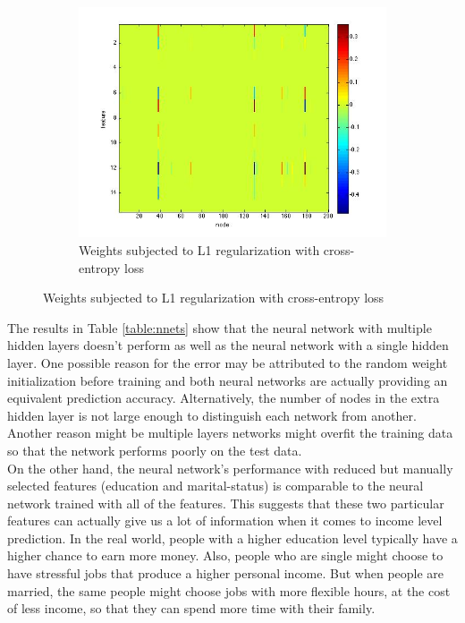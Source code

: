 \documentclass[conference]{IEEEtran}
\begin{document}
\begin{figure}
\begin{subfigure}{\linewidth}
\includegraphics[scale=0.4]{L1CE.jpg}
\caption{Weights subjected to L1 regularization with cross-entropy loss}\label{fig:L1CE}
\end{subfigure}%
\end{figure}
The results in Table \ref{table:nnets} show that the neural network with multiple hidden layers doesn't perform as well as the neural network with a single hidden layer. One possible reason for the error may be attributed to the random weight initialization before training and both neural networks are actually providing an equivalent prediction accuracy. Alternatively, the number of nodes in the extra hidden layer is not large enough to distinguish each network from another. Another reason might be multiple layers networks might overfit the training data so that the network performs poorly on the test data.\\
On the other hand, the neural network's performance with reduced but manually selected features (education and marital-status) is comparable to the neural network trained with all of the features. This suggests that these two particular features can actually give us a lot of information when it comes to income level prediction. In the real world, people with a higher education level typically have a higher chance to earn more money. Also, people who are single might choose to have stressful jobs that produce a higher personal income. But when people are married, the same people might choose jobs with more flexible hours, at the cost of less income, so that they can spend more time with their family.\\ 
\end{document}
